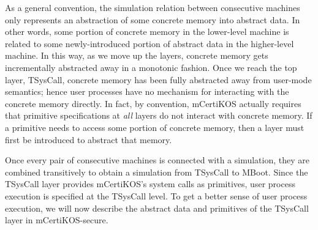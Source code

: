 As a general convention, the simulation relation between 
consecutive machines only represents an abstraction of
some concrete memory into abstract data. In other words,
some portion of concrete memory in the lower-level machine is related
to some newly-introduced portion of abstract data in the higher-level 
machine. In this way, as we move up the layers, concrete memory gets
incrementally abstracted away in a monotonic fashion.
Once we reach the top layer, TSysCall, 
concrete memory has been fully abstracted away from user-mode
semantics; hence user processes have no mechanism for interacting
with the concrete memory directly. In fact, by convention, 
mCertiKOS actually requires that primitive specifications
at \emph{all} layers do not interact with concrete memory.
If a primitive needs to access some portion of concrete memory,
then a layer must first be introduced to abstract that memory.

Once every pair of consecutive machines is connected with a
simulation, they are combined transitively to 
obtain a simulation from TSysCall to MBoot. Since the TSysCall layer
provides mCertiKOS's system calls as primitives, user process
execution is specified at the TSysCall level.
To get a better sense of user process execution, we will now 
describe the abstract data and primitives of the TSysCall layer 
in mCertiKOS-secure.


